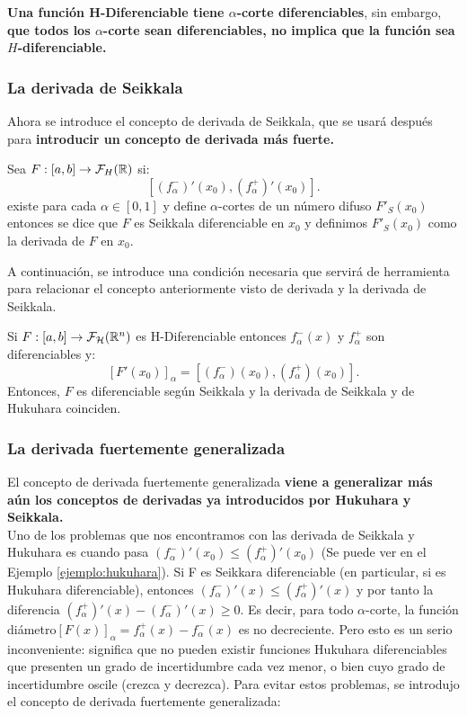 \textbf{Una función H-Diferenciable tiene $\alpha$-corte diferenciables}, sin embargo, \textbf{que todos los $\alpha$-corte sean diferenciables, no implica que la función sea $H$-diferenciable.}

\subsubsection{La derivada de Seikkala}
Ahora se introduce el concepto de derivada de Seikkala, que se usará después para \textbf{introducir un concepto de derivada más fuerte.}

\begin{definicion}
  Sea $F: [a, b] \rightarrow \mathcal{F}_H(\mathbb R)$ si:
  \[
    [(f^-_\alpha)'(x_0), (f^+_\alpha)'(x_0)].
    \]
    existe para cada $\alpha \in [0, 1]$ y define $\alpha$-cortes de un número difuso $F'_S(x_0)$ entonces se dice que $F$ es Seikkala diferenciable en $x_0$ y definimos $F'_S(x_0)$ como la derivada de $F$ en $x_0$.
\end{definicion}

A continuación, se introduce una condición necesaria que servirá de herramienta para relacionar el concepto anteriormente visto de derivada y la derivada de Seikkala.

\begin{teorema}
  Si $F: [a, b] \rightarrow \mathcal{F}_\mathcal{H}(\mathbb R^n)$ es H-Diferenciable entonces $f_\alpha^-(x)$ y $f_\alpha^+$ son diferenciables y:
  \[
    [F'(x_0)]_\alpha = [(f_\alpha^-)(x_0), (f_\alpha^+)(x_0)].
    \]
    Entonces, $F$ es diferenciable según Seikkala y la derivada de Seikkala y de Hukuhara coinciden.
\end{teorema}

\subsubsection{La derivada fuertemente generalizada}
El concepto de derivada fuertemente generalizada \textbf{viene a generalizar más aún los conceptos de derivadas ya introducidos por Hukuhara y Seikkala.} \\

Uno de los problemas que nos encontramos con las derivada de Seikkala y Hukuhara es cuando pasa $(f^-_\alpha)'(x_0) \leq (f^+_\alpha)'(x_0)$ (Se puede ver en el Ejemplo \ref{ejemplo:hukuhara}). Si F es Seikkara diferenciable (en particular, si es Hukuhara diferenciable), entonces $(f_{\alpha}^-)'(x) \le (f_{\alpha}^+)'(x)$ y por tanto la diferencia $(f_{\alpha}^+)'(x) - (f_{\alpha}^-)'(x) \ge 0$. Es decir, para todo $\alpha$-corte, la función diámetro$  [F(x)]_{\alpha} = f_{\alpha}^+(x) - f_{\alpha}^-(x)$ es no decreciente. Pero esto es un serio inconveniente: significa que no pueden existir funciones Hukuhara diferenciables que presenten un grado de incertidumbre cada vez menor, o bien cuyo grado de incertidumbre oscile (crezca y decrezca). Para evitar estos problemas, se introdujo el concepto de derivada fuertemente generalizada:

